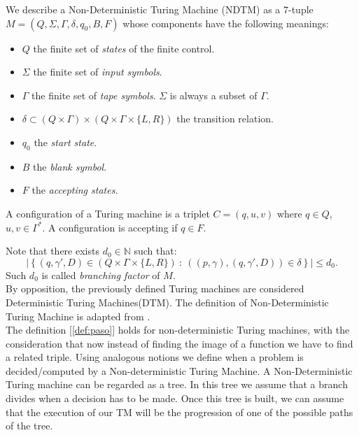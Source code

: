 \begin{definition}\label{def:NDTM} We describe a Non-Deterministic Turing Machine (NDTM) as a 7-tuple $M=(Q, \Sigma, \Gamma, \delta, q_0, B, F)$ whose components have the following meanings:
  \begin{itemize}
  \item $Q$ the finite set of \emph{states} of the finite control.
  \item $\Sigma$ the finite set of \emph{input symbols}.
  \item $\Gamma$ the finite set of \emph{tape symbols}. $\Sigma$ is always a subset of $\Gamma$.
  \item  $\delta\subset (Q\times \Gamma)\times( Q\times\Gamma\times\{L,R\})$ the transition relation.
  \item $q_0$ the \emph{start state}.
  \item $B$ the \emph{blank symbol}.
  \item $F$ the \emph{accepting states}.
  \end{itemize}

  A configuration of a Turing machine is a triplet $C=(q,u,v)$ where $q\in Q$, $u,v\in \Gamma^*$. A configuration is accepting if $q\in F$.
\end{definition}

Note that there exists $d_0 \in \mathbb{N}$ such that:
  $$ \left| \left \{ (q,\gamma',D) \in  ( Q\times\Gamma\times\{L,R\})\ :\ ( (p,\gamma), (q,\gamma',D) ) \in \delta \right \}\right | \le d_0.$$
  Such $d_0$ is called \emph{branching factor} of $M$.\\

By opposition, the previously defined Turing machines are considered Deterministic Turing Machines(DTM). The definition of Non-Deterministic Turing Machine is adapted from \cite{hopcroft2007introduction}. \\
  
The definition [\ref{def:paso}] holds for non-deterministic Turing machines, with the consideration that now instead of finding the image of a function we have to find a related triple. Using analogous notions we define when a problem is decided/computed by a Non-deterministic Turing Machine. A Non-Deterministic Turing machine can be regarded as a tree. In this tree we assume that a branch divides when a decision has to be made. Once this tree is built, we can assume that the execution of our TM will be the progression of one of the possible paths of the tree.\\


